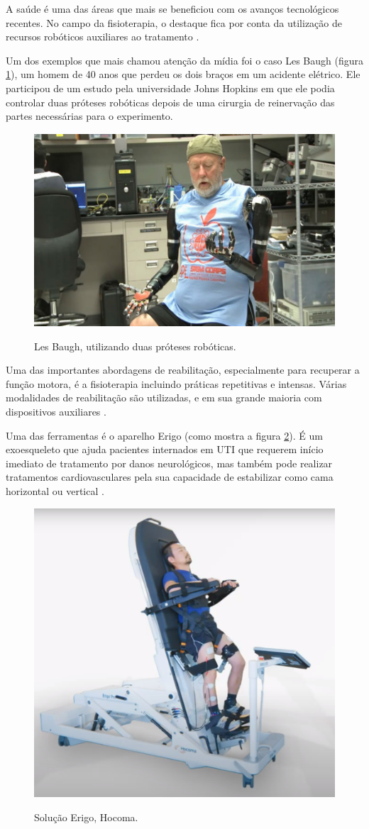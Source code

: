 \documentclass[12pt,a4paper]{article}
\begin{document}
    \par A saúde é uma das áreas que mais se beneficiou com os avanços tecnológicos recentes. No campo da fisioterapia, o destaque fica por conta da utilização de recursos robóticos auxiliares ao tratamento \cite{1}.
    \par Um dos exemplos que mais chamou atenção da mídia foi o caso Les Baugh (figura \ref{fig:les}), um homem de 40 anos que perdeu os dois braços em um acidente elétrico. Ele participou de um estudo pela universidade Johns Hopkins em que ele podia controlar duas próteses robóticas depois de uma cirurgia de reinervação das partes necessárias para o experimento.
    \begin{figure}[ht]
        \caption{Les Baugh, utilizando duas próteses robóticas. \cite{6}}
        \centering
        \includegraphics[width=0.6\linewidth]
        {images/Les.png}
        \label{fig:les}
    \end{figure}
    \par Uma das importantes abordagens de reabilitação, especialmente para recuperar a função motora, é a fisioterapia incluindo práticas repetitivas e intensas. Várias modalidades de reabilitação são utilizadas, e em sua grande maioria com dispositivos auxiliares \cite{2}.
    \par Uma das ferramentas é o aparelho Erigo (como mostra a figura \ref{fig:erigo}). É um exoesqueleto que ajuda pacientes internados em UTI que requerem início imediato de tratamento por danos neurológicos, mas também pode realizar tratamentos cardiovasculares pela sua capacidade de estabilizar como cama horizontal ou vertical \cite{4}.
    \begin{figure}[ht]
        \caption{Solução Erigo, Hocoma. \cite{4}}
        \centering
        \includegraphics[width=0.6\linewidth]
        {images/erigo.png}
        \label{fig:erigo}
    \end{figure}
\end{document}
